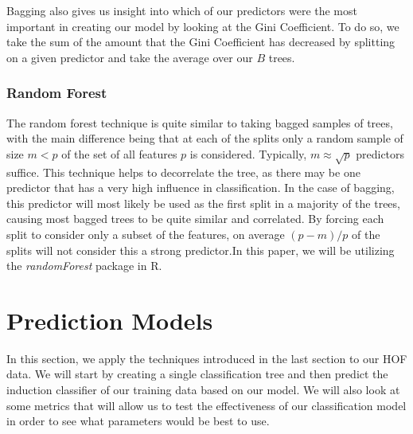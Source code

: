 \documentclass[preprint,12pt]{elsarticle}
\begin{document}
Bagging also gives us insight into which of our predictors were the most important in creating our model by looking at the Gini Coefficient. To do so, we take the sum of the amount that the Gini Coefficient has decreased by splitting on a given predictor and take the average over our $B$ trees.

\subsubsection{Random Forest}



The random forest technique is quite similar to taking bagged  samples of trees, with the main difference being that at each of the splits only a random sample of size $m < p$ of the set of all features $p$ is considered. Typically, $m \approx \sqrt{p}$ predictors suffice\cite{Breiman2001}. This technique helps to decorrelate the tree, as there may be one predictor that has a very high influence in classification. In the case of bagging, this predictor will most likely be used as the first split in a majority of the trees, causing most bagged trees to be quite similar and correlated. By forcing each split to consider only a subset of the features, on average $(p-m)/p$ of the splits will not consider this a strong predictor\cite{Breiman2001}.In this paper, we will be utilizing the \textit{randomForest} package in R. 

\section{Prediction Models}

In this section, we apply the techniques introduced in the last section to our HOF data. We will start by creating a single classification tree and then predict the induction classifier of our training data based on our model. We will also look at some metrics that will allow us to test the effectiveness of our classification model in order to see what parameters would be best to use. 
\end{document}

